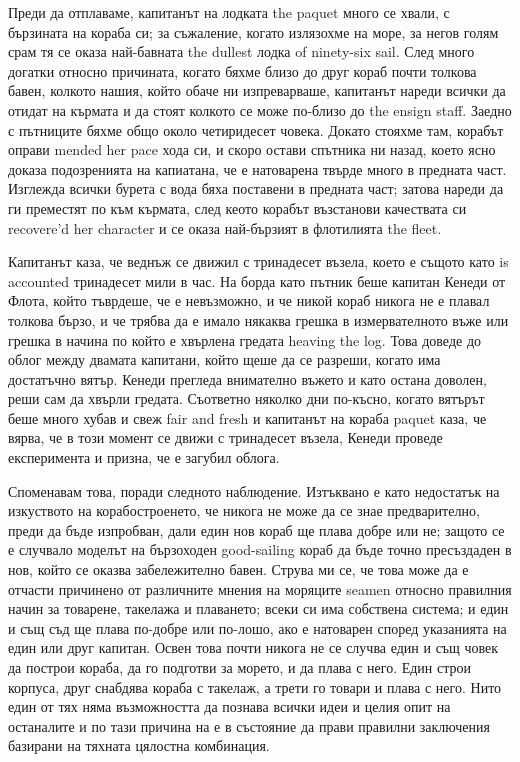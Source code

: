 \documentclass[12pt]{book}
\begin{document}
Преди да отплаваме, капитанът на лодката the paquet много се хвали, с бързината на кораба си; за съжаление, когато излязохме на море, за негов голям срам тя се оказа най-бавната the dullest лодка of ninety-six sail. След много догатки относно причината, когато бяхме близо до друг кораб почти толкова бавен, колкото нашия, който обаче ни изпреварваше, капитанът нареди всички да отидат на кърмата и да стоят колкото се може по-близо до the ensign staff. Заедно с пътниците бяхме общо около четиридесет човека. Докато стояхме там, корабът оправи mended her pace хода си, и скоро остави спътника ни назад, което ясно доказа подозренията на капиатана, че е натоварена твърде много в предната част. Изглежда всички бурета с вода бяха поставени в предната част; затова нареди да ги преместят по към кърмата, след кеото корабът възстанови качествата си recovere'd her character и се оказа най-бързият в флотилията the fleet. 

Капитанът каза, че веднъж се движил с тринадесет възела, което е същото като is accounted тринадесет мили в час. На борда като пътник беше капитан Кенеди от Флота, който тъврдеше, че е невъзможно, и че никой кораб никога не е плавал толкова бързо, и че трябва да е имало някаква грешка в измервателното въже или грешка в начина по който е хвърлена гредата heaving the log. Това доведе до облог между двамата капитани, който щеше да се разреши, когато има достатъчно вятър. Кенеди прегледа внимателно въжето и като остана доволен, реши сам да хвърли гредата. Съответно няколко дни по-късно, когато вятърът беше много хубав и свеж fair and fresh и капитанът на кораба paquet каза, че вярва, че в този момент се движи с тринадесет възела, Кенеди проведе експеримента и призна, че е загубил облога.

Споменавам това, поради следното наблюдение. Изтъквано е като недостатък на изкуството на корабостроенето, че никога не може да се знае предварително, преди да бъде изпробван, дали един нов кораб ще плава добре или не; защото се е случвало моделът на бързоходен good-sailing кораб да бъде точно пресъздаден в нов, който се оказва забележително бавен. Струва ми се, че това може да е отчасти причинено от различните мнения на моряците seamen относно правилния начин за товарене, такелажа и плаването; всеки си има собствена система; и един и същ съд ще плава по-добре или по-лошо, ако е натоварен според указанията на един или друг капитан. Освен това почти никога не се случва един и същ човек да построи кораба, да го подготви за морето, и да плава с него. Един строи  корпуса, друг снабдява кораба с такелаж, а трети го товари и плава с него. Нито един от тях няма възможността да познава всички идеи и целия опит на останалите и по тази причина на е в състояние да прави правилни заключения базирани на тяхната цялостна комбинация. 
\end{document}
